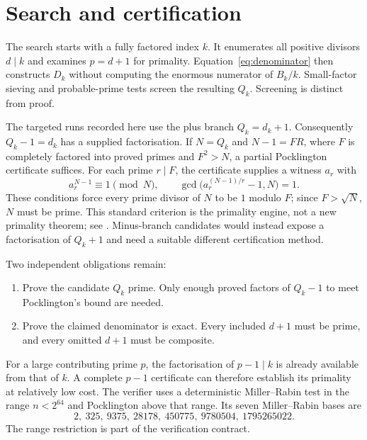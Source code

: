 \documentclass[11pt,a4paper]{article}
\begin{document}
\section{Search and certification}
The search starts with a fully factored index $k$. It enumerates all
positive divisors $d\mid k$ and examines $p=d+1$ for primality.
Equation~\eqref{eq:denominator} then constructs $D_k$ without computing
the enormous numerator of $B_k/k$. Small-factor sieving and probable-prime
tests screen the resulting $Q_k$. Screening is distinct from proof.

The targeted runs recorded here use the plus branch $Q_k=d_k+1$.
Consequently $Q_k-1=d_k$ has a supplied factorisation. If $N=Q_k$ and
$N-1=FR$, where $F$ is completely factored into proved primes and
$F^2>N$, a partial Pocklington certificate suffices. For each prime
$r\mid F$, the certificate supplies a witness $a_r$ with
\[
 a_r^{N-1}\equiv1\pmod N,\qquad
 \gcd\bigl(a_r^{(N-1)/r}-1,N\bigr)=1.
\]
These conditions force every prime divisor of $N$ to be $1$ modulo $F$;
since $F>\sqrt N$, $N$ must be prime. This standard criterion is the
primality engine, not a new primality theorem; see \cite{pocklington}.
Minus-branch candidates would instead expose a factorisation of $Q_k+1$
and need a suitable different certification method.

Two independent obligations remain:
\begin{enumerate}
\item Prove the candidate $Q_k$ prime. Only enough proved factors of
$Q_k-1$ to meet Pocklington's bound are needed.
\item Prove the claimed denominator is exact. Every included $d+1$ must
be prime, and every omitted $d+1$ must be composite.
\end{enumerate}
For a large contributing prime $p$, the factorisation of $p-1\mid k$
is already available from that of $k$. A complete $p-1$ certificate can
therefore establish its primality at relatively low cost. The verifier
uses a deterministic Miller--Rabin test in the range $n<2^{64}$ and
Pocklington above that range. Its seven Miller--Rabin bases are
\[
 2,\ 325,\ 9375,\ 28178,\ 450775,\ 9780504,\ 1795265022.
\]
The range restriction is part of the verification contract.
\end{document}
